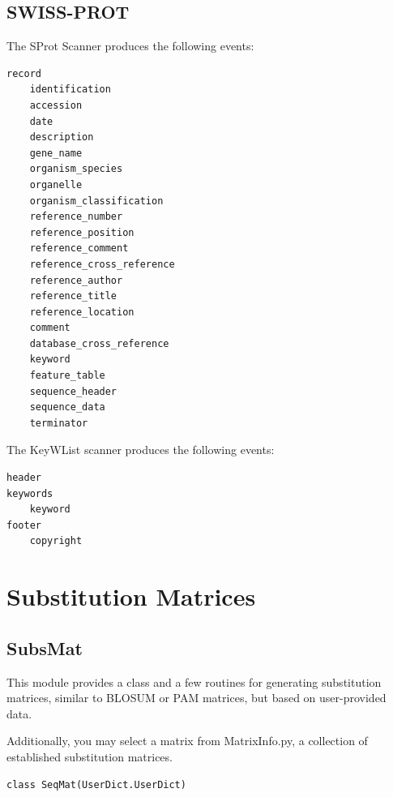 \documentclass{report}
\begin{document}
\subsection{SWISS-PROT}
The SProt Scanner produces the following events:
\begin{verbatim}
record
    identification
    accession
    date
    description
    gene_name
    organism_species
    organelle
    organism_classification
    reference_number
    reference_position
    reference_comment
    reference_cross_reference
    reference_author
    reference_title
    reference_location
    comment
    database_cross_reference
    keyword
    feature_table
    sequence_header
    sequence_data
    terminator
\end{verbatim}


The KeyWList scanner produces the following events:
\begin{verbatim}
header
keywords
    keyword
footer
    copyright
\end{verbatim}

\section{Substitution Matrices}

\subsection{SubsMat}

This module provides a class and a few routines for generating substitution matrices, similar to BLOSUM or PAM matrices, but based on user-provided data.

Additionally, you may select a matrix from MatrixInfo.py, a collection of established substitution matrices.

\begin{verbatim}
class SeqMat(UserDict.UserDict)
\end{verbatim}
\end{document}
